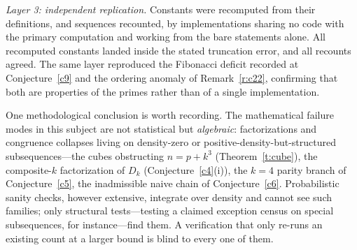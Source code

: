 \documentclass[11pt]{article}
\theoremstyle{definition}
\begin{document}
\emph{Layer 3: independent replication.}  Constants were recomputed
from their definitions, and sequences recounted, by implementations
sharing no code with the primary computation and working from the bare
statements alone.  All recomputed constants landed inside the stated
truncation error, and all recounts agreed.  The same layer reproduced
the Fibonacci deficit recorded at Conjecture~\ref{c9} and the ordering
anomaly of Remark~\ref{r:c22}, confirming that both are properties of
the primes rather than of a single implementation.

One methodological conclusion is worth recording.  The mathematical
failure modes in this subject are not statistical but \emph{algebraic}:
factorizations and congruence collapses living on density-zero or
positive-density-but-structured subsequences---the cubes obstructing
$n=p+k^3$ (Theorem~\ref{t:cube}), the composite-$k$ factorization of
$D_k$ (Conjecture~\ref{c4}(i)), the $k=4$ parity branch of
Conjecture~\ref{c5}, the inadmissible naive chain of
Conjecture~\ref{c6}.  Probabilistic sanity checks, however extensive,
integrate over density and cannot see such families; only structural
tests---testing a claimed exception census on special subsequences, for
instance---find them.  A verification that only re-runs an existing
count at a larger bound is blind to every one of them.
\end{document}
